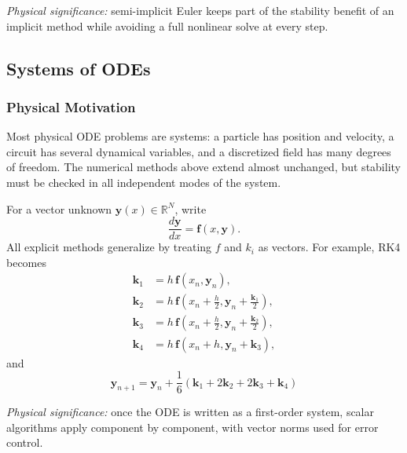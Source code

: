 \textit{Physical significance:} semi-implicit Euler keeps part of the
stability benefit of an implicit method while avoiding a full nonlinear solve
at every step.

\subsection{Systems of ODEs}\label{subsec:lec06:systems}

\subsubsection*{Physical Motivation}
Most physical ODE problems are systems: a particle has position and velocity,
a circuit has several dynamical variables, and a discretized field has many
degrees of freedom. The numerical methods above extend almost unchanged, but
stability must be checked in all independent modes of the system.

For a vector unknown $\mathbf{y}(x)\in\mathbb{R}^N$, write
\begin{equation}
    \frac{d\mathbf{y}}{dx}=\mathbf{f}(x,\mathbf{y}).
    \label{eq:lec06:vector-ode}
\end{equation}
All explicit methods generalize by treating $f$ and $k_i$ as vectors. For
example, RK4 becomes
\begin{align}
    \mathbf{k}_1 &= h\,\mathbf{f}(x_n,\mathbf{y}_n),
    \label{eq:lec06:vector-rk4-k1}\\
    \mathbf{k}_2 &= h\,\mathbf{f}\left(x_n+\frac{h}{2},
        \mathbf{y}_n+\frac{\mathbf{k}_1}{2}\right),
    \label{eq:lec06:vector-rk4-k2}\\
    \mathbf{k}_3 &= h\,\mathbf{f}\left(x_n+\frac{h}{2},
        \mathbf{y}_n+\frac{\mathbf{k}_2}{2}\right),
    \label{eq:lec06:vector-rk4-k3}\\
    \mathbf{k}_4 &= h\,\mathbf{f}(x_n+h,\mathbf{y}_n+\mathbf{k}_3),
    \label{eq:lec06:vector-rk4-k4}
\end{align}
and
\begin{equation}
    \boxed{
    \mathbf{y}_{n+1}
    =\mathbf{y}_n+\frac{1}{6}
    \left(\mathbf{k}_1+2\mathbf{k}_2+2\mathbf{k}_3+\mathbf{k}_4\right)}
    \label{eq:lec06:vector-rk4-update}
\end{equation}

\textit{Physical significance:} once the ODE is written as a first-order
system, scalar algorithms apply component by component, with vector norms
used for error control.

